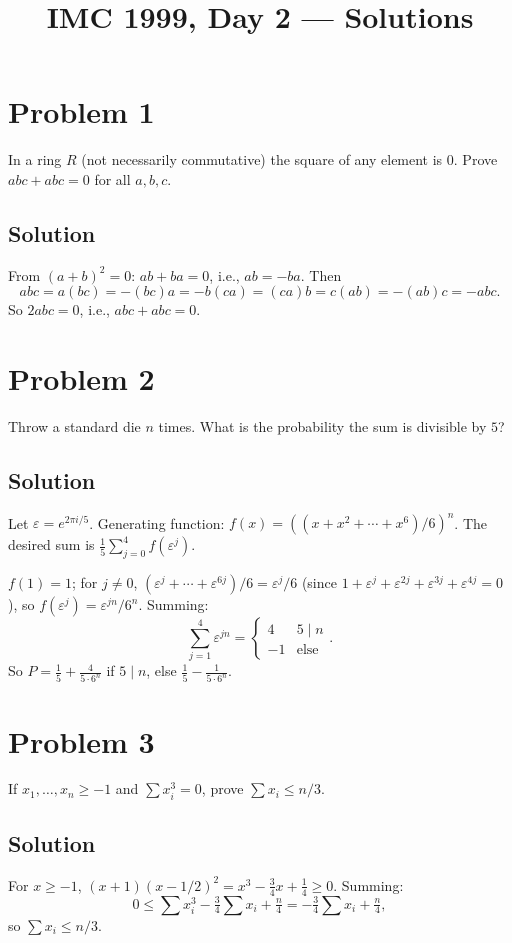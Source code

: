 \documentclass{article}
\title{IMC 1999, Day 2 --- Solutions}
\begin{document}
\maketitle

\section*{Problem 1}
In a ring $R$ (not necessarily commutative) the square of any element is $0$. Prove $abc+abc=0$ for all $a,b,c$.

\subsection*{Solution}
From $(a+b)^2=0$: $ab+ba=0$, i.e., $ab=-ba$. Then
\[abc = a(bc) = -(bc)a = -b(ca) = (ca)b = c(ab) = -(ab)c = -abc.\]
So $2abc=0$, i.e., $abc+abc=0$.

\section*{Problem 2}
Throw a standard die $n$ times. What is the probability the sum is divisible by $5$?

\subsection*{Solution}
Let $\varepsilon = e^{2\pi i/5}$. Generating function: $f(x) = ((x+x^2+\cdots+x^6)/6)^n$. The desired sum is $\frac 15\sum_{j=0}^4 f(\varepsilon^j)$.

$f(1)=1$; for $j\ne 0$, $(\varepsilon^j+\cdots+\varepsilon^{6j})/6 = \varepsilon^j/6$ (since $1+\varepsilon^j+\varepsilon^{2j}+\varepsilon^{3j}+\varepsilon^{4j}=0$), so $f(\varepsilon^j) = \varepsilon^{jn}/6^n$. Summing:
\[\sum_{j=1}^4 \varepsilon^{jn} = \begin{cases}4 & 5\mid n\\ -1 & \text{else}\end{cases}.\]
So $P = \frac{1}{5} + \frac{4}{5\cdot 6^n}$ if $5\mid n$, else $\frac{1}{5} - \frac{1}{5\cdot 6^n}$.

\section*{Problem 3}
If $x_1,\dots,x_n\ge -1$ and $\sum x_i^3 = 0$, prove $\sum x_i \le n/3$.

\subsection*{Solution}
For $x\ge -1$, $(x+1)(x-1/2)^2 = x^3 - \frac 34 x + \frac 14 \ge 0$. Summing:
\[0 \le \sum x_i^3 - \tfrac 34 \sum x_i + \tfrac{n}{4} = -\tfrac 34\sum x_i + \tfrac n4,\]
so $\sum x_i \le n/3$.
\end{document}
